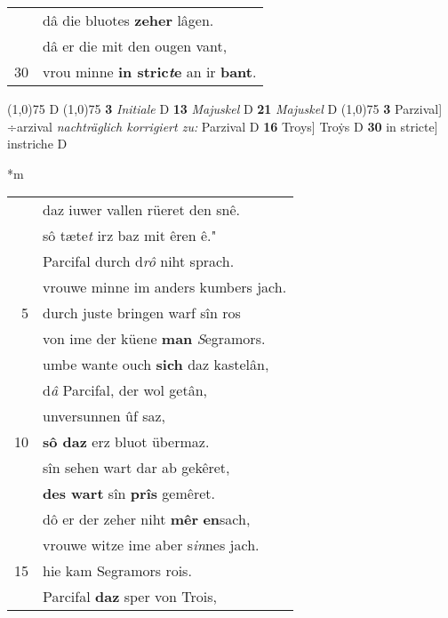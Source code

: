 \documentclass[8pt,a4paper,notitlepage]{article}
\begin{document}
\begin{table}[ht]
\begin{minipage}[t]{0.5\linewidth}
\begin{tabular}{rl}
 & dâ die bluotes \textbf{zeher} lâgen.\\ 
 & dâ er die mit den ougen vant,\\ 
30 & vrou minne \textbf{in stric\textit{t}e} an ir \textbf{bant}.\\ 
\end{tabular}
\scriptsize
\line(1,0){75} \newline
D \newline
\line(1,0){75} \newline
\textbf{3} \textit{Initiale} D  \textbf{13} \textit{Majuskel} D  \textbf{21} \textit{Majuskel} D  \newline
\line(1,0){75} \newline
\textbf{3} Parzival] ÷arzival \textit{nachträglich korrigiert zu:} Parzival D \textbf{16} Troys] Troẏs D \textbf{30} in stricte] instriche D \newline
\end{minipage}
\hspace{0.5cm}
\begin{minipage}[t]{0.5\linewidth}
\small
\begin{center}*m
\end{center}
\begin{tabular}{rl}
 & daz iuwer vallen rüeret den snê.\\ 
 & sô tæte\textit{t} irz baz mit êren ê."\\ 
 & Parcifal durch d\textit{rô} niht sprach.\\ 
 & vrouwe minne im anders kumbers jach.\\ 
5 & durch juste bringen warf sîn ros\\ 
 & von ime der küene \textbf{man} \textit{S}egramors.\\ 
 & umbe wante ouch \textbf{sich} daz kastelân,\\ 
 & d\textit{â} Parcifal, der wol getân,\\ 
 & unversunnen ûf saz,\\ 
10 & \textbf{sô daz} erz bluot übermaz.\\ 
 & sîn sehen wart dar ab gekêret,\\ 
 & \textbf{des wart} sîn \textbf{prîs} gemêret.\\ 
 & dô er der zeher niht \textbf{mêr} \textbf{en}sach,\\ 
 & vrouwe witze ime aber s\textit{in}nes jach.\\ 
15 & hie kam Segramors rois.\\ 
 & Parcifal \textbf{daz} sper von Trois,\\ 

\end{tabular}
\end{minipage}
\end{table}
\end{document}

